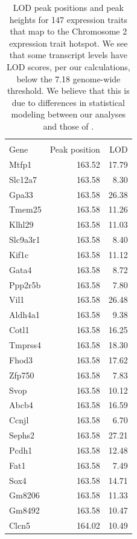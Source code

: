 \documentclass[oneside]{book}\usepackage[]{graphicx}\usepackage[]{color}
\begin{document}
{\small
\begin{longtable}{lrr}
\caption{LOD peak positions and peak heights for 147 expression traits that map to the Chromosome 2 expression trait hotspot. We see that some transcript levels have LOD scores, per our calculations, below the 7.18 genome-wide threshold. We believe that this is due to differences in statistical modeling between our analyses and those of \citet{keller2018genetic}.}\label{tab:chr2-hot}\\ 
\hline \\

Gene & Peak position & LOD \\
  \hline
Mtfp1 & 163.52 & 17.79 \\
  Slc12a7 & 163.58 & 8.30 \\
  Gpa33 & 163.58 & 26.38 \\
  Tmem25 & 163.58 & 11.26 \\
  Klhl29 & 163.58 & 11.03 \\
  Slc9a3r1 & 163.58 & 8.40 \\
  Kif1c & 163.58 & 11.12 \\
  Gata4 & 163.58 & 8.72 \\
  Ppp2r5b & 163.58 & 7.80 \\
  Vil1 & 163.58 & 26.48 \\
  Aldh4a1 & 163.58 & 9.38 \\
  Cotl1 & 163.58 & 16.25 \\
  Tmprss4 & 163.58 & 18.30 \\
  Fhod3 & 163.58 & 17.62 \\
  Zfp750 & 163.58 & 7.83 \\
  Svop & 163.58 & 10.12 \\
  Abcb4 & 163.58 & 16.59 \\
  Ccnjl & 163.58 & 6.70 \\
  Sephs2 & 163.58 & 27.21 \\
  Pcdh1 & 163.58 & 12.48 \\
  Fat1 & 163.58 & 7.49 \\
  Sox4 & 163.58 & 14.71 \\
  Gm8206 & 163.58 & 11.33 \\
  Gm8492 & 163.58 & 10.47 \\
  Clcn5 & 164.02 & 10.49 \\

\end{longtable}}
\end{document}
